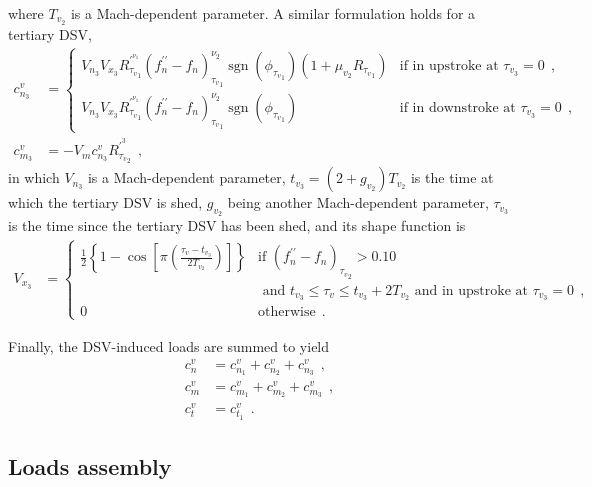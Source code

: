 \documentclass[12pt,a4paper,oneside,english]{abntex2} %
\DeclareMathOperator{\sgn}{sgn}
\def\lb{\left[}
\def\rb{\right]}
\def\lp{\left(}
\def\rp{\right)}
\begin{document}
where $T_{v_2}$ is a Mach-dependent parameter. A similar formulation holds for a tertiary DSV,
\begin{align}
    c_{n_3}^v &= 
    \begin{cases}
    V_{n_3} V_{x_3} R^{\prime^{\nu_1}}_{{\tau_v}_1} \lp f_n^{\prime\prime}-f_n\rp_{{\tau_v}_1}^{\nu_2}  \sgn\lp\phi_{{\tau_v}_1}\rp \lp1+\mu_{v_2} R_{{\tau_v}_1}\rp
    &\text{if in upstroke at } \tau_{v_3} = 0 \ \ ,
    \\
    V_{n_3} V_{x_3} R^{\prime^{\nu_1}}_{{\tau_v}_1} \lp f_n^{\prime\prime}-f_n\rp_{{\tau_v}_1}^{\nu_2}  \sgn\lp\phi_{{\tau_v}_1}\rp 
    &\text{if in downstroke at } \tau_{v_3} = 0 \ \ ,
    \end{cases}
    \label{eq:cnv3} 
    \\
    c_{m_3}^v &= -V_m c_{n_3}^v R^{\prime^3}_{{\tau_v}_2} \ \ ,
    \label{eq:cmv3} 
\end{align}
in which $V_{n_3}$ is a Mach-dependent parameter, $t_{v_3}=\lp2+g_{v_2}\rp T_{v_2}$ is the time at which the tertiary DSV is shed, $g_{v_2}$ being another Mach-dependent parameter, $\tau_{v_3}$ is the time since the tertiary DSV has been shed, and its shape function is
\begin{align}
    V_{x_3} &= 
    \begin{cases}
    \frac{1}{2}\left\{1-\cos{\lb\pi\lp\frac{\tau_v-t_{v_3}}{2T_{v_2}}\rp\rb}\right\}
    &\text{if } \lp f_n^{\prime\prime}-f_n\rp_{{\tau_v}_2} > 0.10
    \\
    &\text{ and } t_{v_3} \leq \tau_v \leq t_{v_3}+2T_{v_2} \text{ and in upstroke at } \tau_{v_3} = 0 \ \ ,
    \\ 
    0  &\text{otherwise} \ \ .
    \end{cases}
    \label{eq:Vx3}
\end{align}

Finally, the DSV-induced loads are summed to yield
\begin{align}
    c_n^v &= c_{n_1}^v + c_{n_2}^v + c_{n_3}^v \ \ ,
    \label{eq:cnv}
    \\
    c_m^v &= c_{m_1}^v + c_{m_2}^v + c_{m_3}^v \ \ ,
    \label{eq:cmv}
    \\
    c_t^v &= c_{t_1}^v \ \ .
    \label{eq:ctv}
\end{align}

\subsection{Loads assembly}
\end{document}
